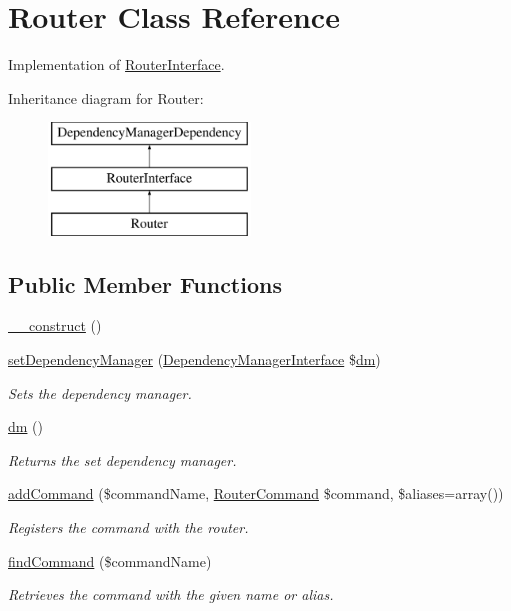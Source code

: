 \hypertarget{classRouter}{\section{Router Class Reference}
\label{classRouter}
}


Implementation of \hyperlink{interfaceRouterInterface}{Router\-Interface}.  


Inheritance diagram for Router\-:\begin{figure}[H]
\begin{center}
\leavevmode
\includegraphics[height=3.000000cm]{classRouter}
\end{center}
\end{figure}
\subsection*{Public Member Functions}
\begin{DoxyCompactItemize}
\item 
\hyperlink{classRouter_a7e6a5676f5599dedca57e257b8866961}{\-\_\-\-\_\-construct} ()
\item 
\hyperlink{classRouter_accbae4193c109f38cf4344a45a59f4e2}{set\-Dependency\-Manager} (\hyperlink{interfaceDependencyManagerInterface}{Dependency\-Manager\-Interface} \$\hyperlink{classRouter_a30bdbace1d83a791796a35df14811942}{dm})
\begin{DoxyCompactList}\small\item\em Sets the dependency manager. \end{DoxyCompactList}\item 
\hyperlink{classRouter_a30bdbace1d83a791796a35df14811942}{dm} ()
\begin{DoxyCompactList}\small\item\em Returns the set dependency manager. \end{DoxyCompactList}\item 
\hyperlink{classRouter_a32049ea75355169c53ef8dec3217a55a}{add\-Command} (\$command\-Name, \hyperlink{interfaceRouterCommand}{Router\-Command} \$command, \$aliases=array())
\begin{DoxyCompactList}\small\item\em Registers the command with the router. \end{DoxyCompactList}\item 
\hyperlink{classRouter_aadae3200dcc446518eccd079fb76b568}{find\-Command} (\$command\-Name)
\begin{DoxyCompactList}\small\item\em Retrieves the command with the given name or alias. \end{DoxyCompactList}\end{DoxyCompactItemize}
